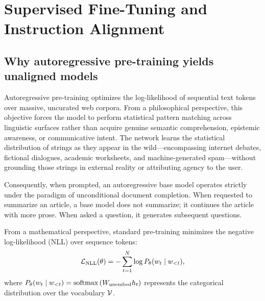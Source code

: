 \documentclass[../../main.tex]{subfiles}
\begin{document}
\section{Supervised Fine-Tuning and Instruction Alignment}
\label{sec:instruction_tuning_t0_flan}

\subsection{Why autoregressive pre-training yields unaligned models}
\label{subsec:why_autoregressive_yields_unaligned}

Autoregressive pre-training optimizes the log-likelihood of sequential text tokens over massive, uncurated web corpora. From a philosophical perspective, this objective forces the model to perform statistical pattern matching across linguistic surfaces rather than acquire genuine semantic comprehension, epistemic awareness, or communicative intent. The network learns the statistical distribution of strings as they appear in the wild---encompassing internet debates, fictional dialogues, academic worksheets, and machine-generated spam---without grounding those strings in external reality or attributing agency to the user. 

Consequently, when prompted, an autoregressive base model operates strictly under the paradigm of unconditional document completion. When requested to summarize an article, a base model does not summarize; it continues the article with more prose. When asked a question, it generates subsequent questions.

From a mathematical perspective, standard pre-training minimizes the negative log-likelihood (NLL) over sequence tokens:
\begin{equation}
\label{eq:nll_loss_critique}
\mathcal{L}_{\text{NLL}}(\theta) = -\sum_{t=1}^N \log P_\theta(w_t \mid w_{<t}),
\end{equation}
where $P_\theta(w_t \mid w_{<t}) = \operatorname{\mathrm{softmax}}\left(W_{\text{unembed}} h_t\right)$ represents the categorical distribution over the vocabulary $\mathcal{V}$. 
\end{document}
